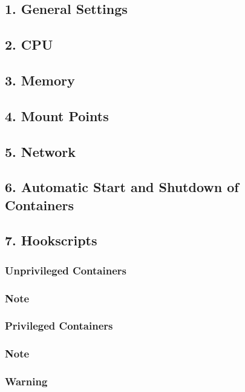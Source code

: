 \subsection{1. General Settings}

\subsection{2. CPU}

\subsection{3. Memory}

\subsection{4. Mount Points}

\subsection{5. Network}

\subsection{6. Automatic Start and Shutdown of Containers}

\subsection{7. Hookscripts}

\subsubsection{Unprivileged Containers}

\subsubsection{Note}

\subsubsection{Privileged Containers}

\subsubsection{Note}

\subsubsection{Warning}

